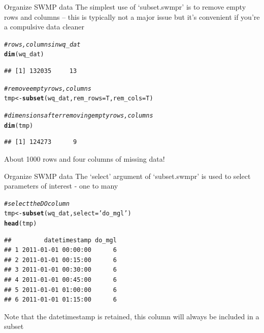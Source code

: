 \documentclass[xcolor=svgnames]{beamer}\usepackage[]{graphicx}\usepackage[]{color}
\makeatletter
\newcommand{\hlstr}[1]{\textcolor[rgb]{0.192,0.494,0.8}{#1}}%
\newcommand{\hlcom}[1]{\textcolor[rgb]{0.678,0.584,0.686}{\textit{#1}}}%
\newcommand{\hlstd}[1]{\textcolor[rgb]{0.345,0.345,0.345}{#1}}%
\newcommand{\hlkwb}[1]{\textcolor[rgb]{0.69,0.353,0.396}{#1}}%
\newcommand{\hlkwc}[1]{\textcolor[rgb]{0.333,0.667,0.333}{#1}}%
\newcommand{\hlkwd}[1]{\textcolor[rgb]{0.737,0.353,0.396}{\textbf{#1}}}%
\newenvironment{kframe}{%
 \def\at@end@of@kframe{}%
 \ifinner\ifhmode%
  \def\at@end@of@kframe{\end{minipage}}%
  \begin{minipage}{\columnwidth}%
 \fi\fi%
 \def\FrameCommand##1{\hskip\@totalleftmargin \hskip-\fboxsep
 \colorbox{shadecolor}{##1}\hskip-\fboxsep
     \hskip-\linewidth \hskip-\@totalleftmargin \hskip\columnwidth}%
 \MakeFramed {\advance\hsize-\width
   \@totalleftmargin\z@ \linewidth\hsize
   \@setminipage}}%
 {\par\unskip\endMakeFramed%
 \at@end@of@kframe}
\newenvironment{knitrout}{}{} %
\makeatother
\begin{document}
\begin{frame}[containsverbatim]{Organize SWMP data}
The simplest use of `subset.swmpr' is to remove empty rows and columns -- this is typically not a major issue but it's convenient if you're a compulsive data cleaner
\begin{knitrout}\scriptsize
{}\color{fgcolor}\begin{kframe}
\begin{alltt}
\hlcom{# rows, columns in wq_dat}
\hlkwd{dim}\hlstd{(wq_dat)}
\end{alltt}
\begin{verbatim}
## [1] 132035     13
\end{verbatim}
\begin{alltt}
\hlcom{# remove empty rows, columns}
\hlstd{tmp} \hlkwb{<-} \hlkwd{subset}\hlstd{(wq_dat,} \hlkwc{rem_rows} \hlstd{= T,} \hlkwc{rem_cols} \hlstd{= T)}

\hlcom{# dimensions after removing empty rows, columns}
\hlkwd{dim}\hlstd{(tmp)}
\end{alltt}
\begin{verbatim}
## [1] 124273      9
\end{verbatim}
\end{kframe}
\end{knitrout}
About 1000 rows and four columns of missing data!
\end{frame}

\begin{frame}[containsverbatim]{Organize SWMP data}
The `select' argument of `subset.swmpr' is used to select parameters of interest - one to many
\begin{knitrout}\scriptsize
{}\color{fgcolor}\begin{kframe}
\begin{alltt}
\hlcom{# select the DO column}
\hlstd{tmp} \hlkwb{<-} \hlkwd{subset}\hlstd{(wq_dat,} \hlkwc{select} \hlstd{=} \hlstr{'do_mgl'}\hlstd{)}
\hlkwd{head}\hlstd{(tmp)}
\end{alltt}
\begin{verbatim}
##         datetimestamp do_mgl
## 1 2011-01-01 00:00:00      6
## 2 2011-01-01 00:15:00      6
## 3 2011-01-01 00:30:00      6
## 4 2011-01-01 00:45:00      6
## 5 2011-01-01 01:00:00      6
## 6 2011-01-01 01:15:00      6
\end{verbatim}
\end{kframe}
\end{knitrout}
Note that the datetimestamp is retained, this column will always be included in a subset
\end{frame}
\end{document}
